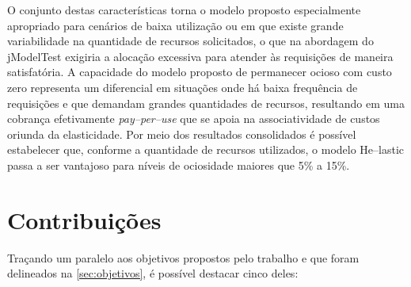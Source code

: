 \documentclass[english,brazilian]{UNISINOSmonografia} %
\begin{document}
O conjunto destas características torna o modelo proposto especialmente apropriado para cenários de baixa utilização ou em que existe grande variabilidade na quantidade de recursos solicitados, o que na abordagem do jModelTest exigiria a alocação excessiva para atender às requisições de maneira satisfatória.
%
A capacidade do modelo proposto de permanecer ocioso com custo zero representa um diferencial em situações onde há baixa frequência de requisições e que demandam grandes quantidades de recursos, resultando em uma cobrança efetivamente \textit{pay--per--use} que se apoia na associatividade de custos oriunda da elasticidade.
%
Por meio dos resultados consolidados é possível estabelecer que, conforme a quantidade de recursos utilizados, o modelo \textsf{He}--lastic passa a ser vantajoso para níveis de ociosidade maiores que 5\% a 15\%.




\section{Contribuições}



Traçando um paralelo aos objetivos propostos pelo trabalho e que foram delineados na \autoref{sec:objetivos}, é possível destacar cinco deles:
\end{document}
